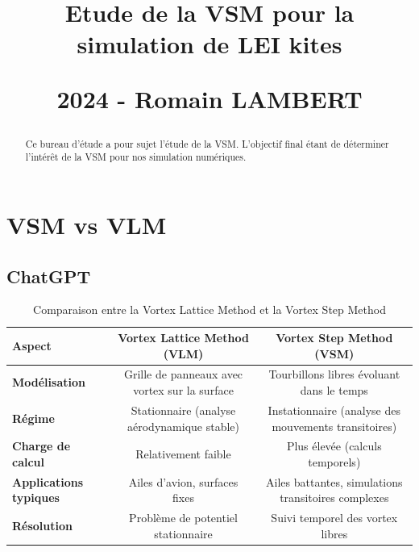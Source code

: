 \documentclass[conference]{IEEEtran}
\begin{document}
\title{\LARGE Etude de la VSM pour la simulation de LEI kites
\vskip10pt

\small 2024 - Romain LAMBERT
}
\maketitle

\begin{abstract}Ce bureau d'étude a pour sujet l'étude de la VSM. L'objectif final étant de déterminer l'intérêt de la VSM pour nos simulation numériques. 
\end{abstract}
\IEEEoverridecommandlockouts

\IEEEpeerreviewmaketitle
\section{VSM vs VLM }

\subsection{\textbf{ChatGPT}} 

\begin{table}[h!]
    \centering
    \begin{tabular}{|l|c|c|}
    \hline
    \textbf{Aspect}                  & \textbf{Vortex Lattice Method (VLM)}              & \textbf{Vortex Step Method (VSM)}               \\ \hline
    \textbf{Modélisation}            & Grille de panneaux avec vortex sur la surface     & Tourbillons libres évoluant dans le temps       \\ \hline
    \textbf{Régime}                  & Stationnaire (analyse aérodynamique stable)       & Instationnaire (analyse des mouvements transitoires) \\ \hline
    \textbf{Charge de calcul}        & Relativement faible                               & Plus élevée (calculs temporels)                 \\ \hline
    \textbf{Applications typiques}   & Ailes d’avion, surfaces fixes                     & Ailes battantes, simulations transitoires complexes \\ \hline
    \textbf{Résolution}              & Problème de potentiel stationnaire                & Suivi temporel des vortex libres                \\ \hline
    \end{tabular}
    \caption{Comparaison entre la Vortex Lattice Method et la Vortex Step Method}
    \end{table}
    
\end{document}
